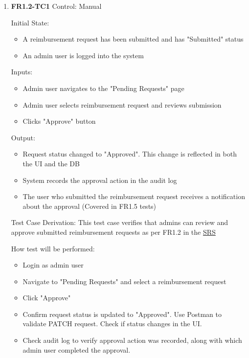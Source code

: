\documentclass[12pt, titlepage]{article}
\begin{document}
\begin{enumerate}
    \item{\textbf{FR1.2-TC1}}
    Control: Manual	
    
    Initial State:
    \begin{itemize}
        \item A reimbursement request has been submitted and has "Submitted" status
        \item An admin user is logged into the system
    \end{itemize}
    
    Inputs:					
    \begin{itemize}
        \item Admin user navigates to the "Pending Requests" page
        \item Admin user selects reimbursement request and reviews submission
        \item Clicks "Approve" button
    \end{itemize}
    
    Output: 
    \begin{itemize}
        \item Request status changed to "Approved". This change is reflected in both the UI and the DB
        \item System records the approval action in the audit log
        \item The user who submitted the reimbursement request receives a notification about the approval (Covered in FR1.5 tests)
    \end{itemize}
    
    Test Case Derivation: This test case verifies that admins can review and approve submitted reimbursement requests as per FR1.2 in the \href{https://shorturl.at/FdAgR}{SRS}
    
    How test will be performed:
    \begin{itemize}
        \item Login as admin user
        \item Navigate to "Pending Requests" and select a reimbursement request
        \item Click "Approve"
        \item Confirm request status is updated to "Approved". Use Postman to validate PATCH request. Check if status changes in the UI.
        \item Check audit log to verify approval action was recorded, along with which admin user completed the approval.
    \end{itemize}


\end{enumerate}
\end{document}
